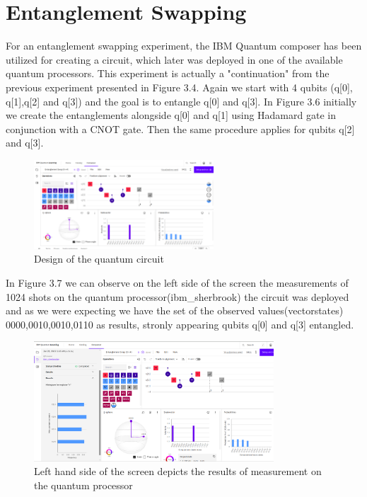 		\section{Entanglement Swapping}

		For an entanglement swapping experiment, the IBM Quantum composer has been utilized for creating a circuit, which later
		was deployed in one of the available quantum processors. This experiment is actually a "continuation" from the 
		previous experiment presented in Figure 3.4. Again we start with 4 qubits (q[0], q[1],q[2] and q[3]) and the goal is to entangle
		q[0] and q[3]. In Figure 3.6 initially we create the entanglements alongside q[0] and q[1] using Hadamard gate in conjunction with
		a CNOT gate. Then the same procedure applies for qubits q[2] and q[3].

		\begin{figure}[h!]
			\centering
			\includegraphics[width=0.6\textwidth]{ibmq/a.png}
			\caption{Design of the quantum circuit}
			\label{fig:}
		\end{figure}		
		

		In Figure 3.7 we can observe on the left side of the screen the measurements of 1024 shots on the quantum processor(ibm\_sherbrook)
		the circuit was deployed and as we were expecting we have the set of the observed values(vectorstates)
		0000,0010,0010,0110 as results, stronly appearing qubits q[0] and q[3] entangled.

		\begin{figure}[h!]
			\centering
			\includegraphics[width=0.8\textwidth]{ibmq/b.png}
			\caption{Left hand side of the screen depicts the results of measurement on the quantum processor}
			\label{fig:}
		\end{figure}		
	


